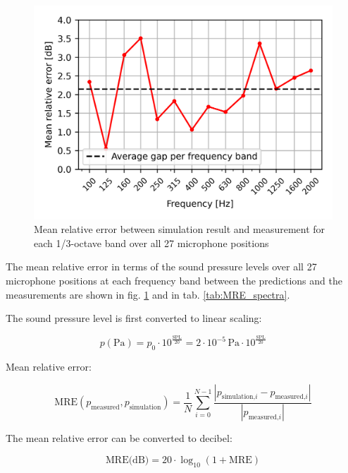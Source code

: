 \begin{figure}[H]
	\centering
	\includegraphics{fig/chap5/initial_model/freq_spectrum/average_gap.png}
	\caption{Mean relative error between simulation result and measurement for each 1/3-octave band over all 27 microphone positions}
	\label{fig:gap_freq_spectrum}
\end{figure}


The mean relative error in terms of the sound pressure levels over all 27 microphone positions at each frequency band between the predictions and the measurements are shown in fig. \ref{fig:gap_freq_spectrum} and in tab. \ref{tab:MRE_spectra}.

The sound pressure level is first converted to linear scaling:

\begin{equation}
	p(\text{Pa}) = p_0 \cdot 10^{\frac{\text{SPL}}{20}} = 2\cdot10^{-5}\,\text{Pa} \cdot 10^{\frac{\text{SPL}}{20}}
\end{equation}

Mean relative error:

\begin{equation}
	\text{MRE}(p_{\text{measured}}, p_{\text{simulation}}) = \frac{1}{N} \sum_{i=0}^{N - 1} \frac{|p_{\text{simulation,}i} - p_{\text{measured,}i}|}{|p_{\text{measured,}i}|}
\end{equation}

The mean relative error  can be converted to decibel:

\begin{equation}
	\text{MRE(dB)} = 20\cdot\log_{10}(1 + \text{MRE})
\end{equation}

